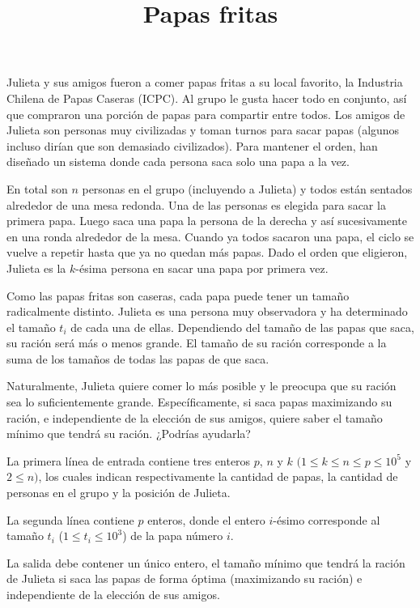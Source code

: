\documentclass{oci}
\title{Papas fritas}
\begin{document}
\begin{problemDescription}
	Julieta y sus amigos fueron a comer papas fritas a su local favorito,
	la Industria Chilena de Papas Caseras (ICPC).
	Al grupo le gusta hacer todo en conjunto, así que compraron una porción
	de papas para compartir entre todos.
	Los amigos de Julieta son personas muy civilizadas y toman turnos para
	sacar papas (algunos incluso dirían que son demasiado civilizados).
	Para mantener el orden, han diseñado un sistema donde cada
	persona saca solo una papa a la vez.

	En total son $n$ personas en el grupo (incluyendo a Julieta) y todos están
	sentados alrededor de una mesa redonda.
	Una de las personas es elegida para sacar la primera papa.
	Luego saca una papa la persona de la derecha y así sucesivamente en una
	ronda alrededor de la mesa.
	Cuando ya todos sacaron una papa, el ciclo se vuelve a repetir hasta que ya no
	quedan más papas.
	Dado el orden que eligieron, Julieta es la $k$-ésima persona en sacar una papa
	por primera vez.

	Como las papas fritas son caseras, cada papa puede tener un tamaño radicalmente
	distinto.
	Julieta es una persona muy observadora y ha determinado el tamaño $t_i$ de cada una
	de ellas.
	Dependiendo del tamaño de las papas que saca, su ración será más o menos grande.
	El tamaño de su ración corresponde a la suma de los tamaños de todas
	las papas de que saca.

	Naturalmente, Julieta quiere comer lo más posible y le preocupa que su ración
	sea lo suficientemente grande.
	Específicamente, si saca papas maximizando su ración, e independiente
	de la elección de sus amigos, quiere saber el tamaño mínimo que tendrá su ración.
	¿Podrías ayudarla?
\end{problemDescription}

\begin{inputDescription}
	La primera línea de entrada contiene tres enteros $p$, $n$ y $k$
	$(1 \leq k \leq n \leq p \leq 10^5$ y $2 \leq n)$, los cuales
	indican respectivamente la cantidad de papas, la cantidad de personas en el grupo
	y la posición de Julieta.

	La segunda línea contiene $p$ enteros, donde el entero $i$-ésimo
	corresponde al tamaño $t_i$ ($1 \leq t_i \leq 10^3$) de la papa número $i$.
\end{inputDescription}

\begin{outputDescription}
	La salida debe contener un único entero, el tamaño mínimo que tendrá la ración
	de Julieta si saca las papas de forma óptima (maximizando su ración) e independiente
	de la elección de sus amigos.
\end{outputDescription}
\end{document}
